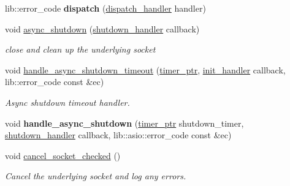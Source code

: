 \begin{DoxyCompactItemize}
\mbox{\label{classwebsocketpp_1_1transport_1_1asio_1_1connection_a660c671234223eb60517d26bbbc0268a}} 
lib\+::error\+\_\+code {\bfseries dispatch} (\mbox{\hyperlink{namespacewebsocketpp_1_1transport_a6658447b2e10f4c712dd792aad0e0c78}{dispatch\+\_\+handler}} handler)
\item 
\mbox{\label{classwebsocketpp_1_1transport_1_1asio_1_1connection_a7a3767d922bb2cc97f71dd2fb2f0e903}} 
void \mbox{\hyperlink{classwebsocketpp_1_1transport_1_1asio_1_1connection_a7a3767d922bb2cc97f71dd2fb2f0e903}{async\+\_\+shutdown}} (\mbox{\hyperlink{namespacewebsocketpp_1_1transport_af39aff6fc4cb76f7df0d5322b734d156}{shutdown\+\_\+handler}} callback)
\begin{DoxyCompactList}\small\item\em close and clean up the underlying socket \end{DoxyCompactList}\item 
void \mbox{\hyperlink{classwebsocketpp_1_1transport_1_1asio_1_1connection_a9386ad48e8b2137987205bc4e831edfb}{handle\+\_\+async\+\_\+shutdown\+\_\+timeout}} (\mbox{\hyperlink{classwebsocketpp_1_1transport_1_1asio_1_1connection_a96d8a6cd5cf1120208b206da109a194e}{timer\+\_\+ptr}}, \mbox{\hyperlink{namespacewebsocketpp_1_1transport_aeae75e675c1a334b3b33ab7120b480a5}{init\+\_\+handler}} callback, lib\+::error\+\_\+code const \&ec)
\begin{DoxyCompactList}\small\item\em Async shutdown timeout handler. \end{DoxyCompactList}\item 
\mbox{\label{classwebsocketpp_1_1transport_1_1asio_1_1connection_ad7a28616792a3bae4dfc215ebfc640c6}} 
void {\bfseries handle\+\_\+async\+\_\+shutdown} (\mbox{\hyperlink{classwebsocketpp_1_1transport_1_1asio_1_1connection_a96d8a6cd5cf1120208b206da109a194e}{timer\+\_\+ptr}} shutdown\+\_\+timer, \mbox{\hyperlink{namespacewebsocketpp_1_1transport_af39aff6fc4cb76f7df0d5322b734d156}{shutdown\+\_\+handler}} callback, lib\+::asio\+::error\+\_\+code const \&ec)
\item 
\mbox{\label{classwebsocketpp_1_1transport_1_1asio_1_1connection_ac4b63fadf2083ab4656ab7f1a47d3b5d}} 
void \mbox{\hyperlink{classwebsocketpp_1_1transport_1_1asio_1_1connection_ac4b63fadf2083ab4656ab7f1a47d3b5d}{cancel\+\_\+socket\+\_\+checked}} ()
\begin{DoxyCompactList}\small\item\em Cancel the underlying socket and log any errors. \end{DoxyCompactList}\end{DoxyCompactItemize}

